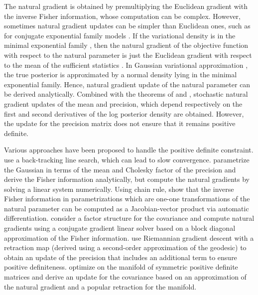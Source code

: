 \documentclass{statsoc}
\begin{document}
The natural gradient is obtained by premultiplying the Euclidean gradient with the inverse Fisher information, whose computation can be complex. However, sometimes natural gradient updates can be simpler than Euclidean ones, such as for conjugate exponential family models \citep{Hoffman2013}. If the variational density is in the minimal exponential family \citep{Wainwright2008}, then the natural gradient of the objective function with respect to the natural parameter is just the Euclidean gradient with respect to the mean of the sufficient statistics \citep{Khan2017}. In Gaussian variational approximation \citep{Opper2009}, the true posterior is approximated by a normal density lying in the minimal exponential family. Hence, natural gradient update of the natural parameter can be derived analytically. Combined with the theorems of \cite{Bonnet1964} and \cite{Price1958}, stochastic natural gradient updates of the mean and precision, which depend respectively on the first and second derivatives of the log posterior density \citep{Khan2018} are obtained. However, the update for the precision matrix does not ensure that it remains positive definite. 

Various approaches have been proposed to handle the positive definite constraint. \cite{Khan2017} use a back-tracking line search, which can lead to slow convergence. \cite{Ong2018a} parametrize the Gaussian in terms of the mean and Cholesky factor of the precision  and derive the Fisher information analytically, but compute the natural gradients by solving a linear system numerically. Using chain rule, \cite{Salimbeni2018} show that the inverse Fisher information in parametrizations which are one-one transformations of the natural parameter can be computed as a Jacobian-vector product via automatic differentiation. \cite{Tran2020} consider a factor structure for the covariance and compute natural gradients using a conjugate gradient linear solver based on a block diagonal approximation of the Fisher information. \cite{Lin2020} use Riemannian gradient descent with a retraction map (derived using a second-order approximation of the geodesic) to obtain an update of the precision that includes an additional term to ensure positive definiteness. \cite{Tran2020} optimize on the manifold of symmetric positive definite matrices and derive an update for the covariance based on an approximation of the natural gradient and a popular retraction for the manifold.
\end{document}
